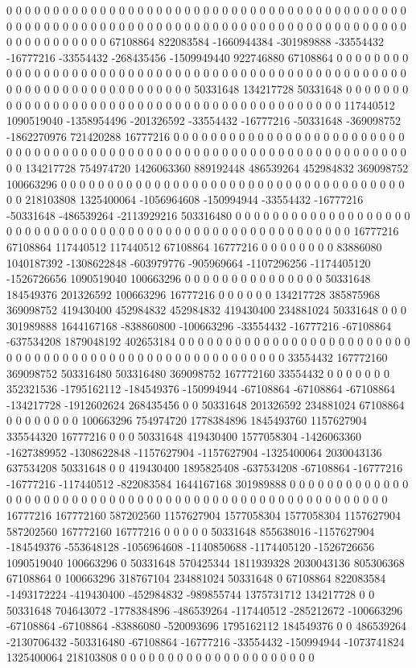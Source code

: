 0 0 0 0 0 0 0 0 0 0 0 0 0 0 0 0 0 0 0 0 0 0 0 0 0 0 0 0 0 0 0 0 0 0 0 0 0 0 0 0 0 0 0 0 0 0 0 0 0 0 0 0 0 0 0 0 0 0 0 0 0 0 0 0 0 0 0 0 0 0 0 0 0 0 0 0 0 0 0 0 0 0 0 0 0 0 0 0 0 0 0 0 0 0 0 0 0 67108864 822083584 -1660944384 -301989888 -33554432 -16777216 -33554432 -268435456 -1509949440 922746880 67108864 0 0 0 0 0 0 0 0 0 0 0 0 0 0 0 0 0 0 0 0
0 0 0 0 0 0 0 0 0 0 0 0 0 0 0 0 0 0 0 0 0 0 0 0 0 0 0 0 0 0 0 0 0 0 0 0 0 0 0 0 0 0 0 0 0 0 0 0 0 0 0 50331648 134217728 50331648 0 0 0 0 0 0 0 0 0 0 0 0 0 0 0 0 0 0 0 0 0 0 0 0 0 0 0 0 0 0 0 0 0 0 0 0 0 0 0 0 0 0 0 117440512 1090519040 -1358954496 -201326592 -33554432 -16777216 -50331648 -369098752 -1862270976 721420288 16777216 0 0 0 0 0 0 0 0 0 0 0 0 0 0 0 0 0 0 0 0
0 0 0 0 0 0 0 0 0 0 0 0 0 0 0 0 0 0 0 0 0 0 0 0 0 0 0 0 0 0 0 0 0 0 0 0 0 0 0 0 0 0 0 0 0 0 0 0 0 0 134217728 754974720 1426063360 889192448 486539264 452984832 369098752 100663296 0 0 0 0 0 0 0 0 0 0 0 0 0 0 0 0 0 0 0 0 0 0 0 0 0 0 0 0 0 0 0 0 0 0 0 0 0 0 0 218103808 1325400064 -1056964608 -150994944 -33554432 -16777216 -50331648 -486539264 -2113929216 503316480 0 0 0 0 0 0 0 0 0 0 0 0 0 0 0 0 0 0 0 0 0
0 0 0 0 0 0 0 0 0 0 0 0 0 0 0 0 0 0 0 0 0 0 0 0 0 0 0 0 0 0 0 0 0 0 0 16777216 67108864 117440512 117440512 67108864 16777216 0 0 0 0 0 0 0 0 83886080 1040187392 -1308622848 -603979776 -905969664 -1107296256 -1174405120 -1526726656 1090519040 100663296 0 0 0 0 0 0 0 0 0 0 0 0 0 0 0 50331648 184549376 201326592 100663296 16777216 0 0 0 0 0 0 134217728 385875968 369098752 419430400 452984832 452984832 419430400 234881024 50331648 0 0 0 301989888 1644167168 -838860800 -100663296 -33554432 -16777216 -67108864 -637534208 1879048192 402653184 0 0 0 0 0 0 0 0 0 0 0 0 0 0 0 0 0 0 0 0 0
0 0 0 0 0 0 0 0 0 0 0 0 0 0 0 0 0 0 0 0 0 0 0 0 0 0 0 0 0 0 0 0 0 0 33554432 167772160 369098752 503316480 503316480 369098752 167772160 33554432 0 0 0 0 0 0 0 352321536 -1795162112 -184549376 -150994944 -67108864 -67108864 -67108864 -134217728 -1912602624 268435456 0 0 50331648 201326592 234881024 67108864 0 0 0 0 0 0 0 0 100663296 754974720 1778384896 1845493760 1157627904 335544320 16777216 0 0 0 50331648 419430400 1577058304 -1426063360 -1627389952 -1308622848 -1157627904 -1157627904 -1325400064 2030043136 637534208 50331648 0 0 419430400 1895825408 -637534208 -67108864 -16777216 -16777216 -117440512 -822083584 1644167168 301989888 0 0 0 0 0 0 0 0 0 0 0 0 0 0 0 0 0 0 0 0 0
0 0 0 0 0 0 0 0 0 0 0 0 0 0 0 0 0 0 0 0 0 0 0 0 0 0 0 0 0 0 0 0 0 16777216 167772160 587202560 1157627904 1577058304 1577058304 1157627904 587202560 167772160 16777216 0 0 0 0 0 50331648 855638016 -1157627904 -184549376 -553648128 -1056964608 -1140850688 -1174405120 -1526726656 1090519040 100663296 0 50331648 570425344 1811939328 2030043136 805306368 67108864 0 100663296 318767104 234881024 50331648 0 67108864 822083584 -1493172224 -419430400 -452984832 -989855744 1375731712 134217728 0 0 50331648 704643072 -1778384896 -486539264 -117440512 -285212672 -100663296 -67108864 -67108864 -83886080 -520093696 1795162112 184549376 0 0 486539264 -2130706432 -503316480 -67108864 -16777216 -33554432 -150994944 -1073741824 1325400064 218103808 0 0 0 0 0 0 0 0 0 0 0 0 0 0 0 0 0 0 0 0 0
